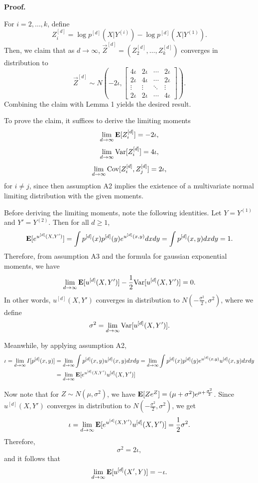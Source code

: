 \textbf{Proof.}

For $i = 2,\hdots, k$, define
\[
Z_i^{[d]} = \log p^{[d]}(X|Y^{(i)}) - \log p^{[d]}(X|Y^{(1)}).
\]
Then, we claim that as $d \to \infty$, $\vec{Z}^{[d]} = (Z_2^{[d]},\hdots, Z_k^{[d]})$ converges in distribution to
\[
\vec{Z}^{[d]} \sim N\left(-2\iota, 
\begin{bmatrix}
4\iota & 2\iota & \cdots & 2\iota\\
2\iota & 4\iota & \cdots & 2\iota\\
\vdots & \vdots & \ddots & \vdots\\
2\iota & 2\iota & \cdots & 4\iota
\end{bmatrix}
\right).
\]
Combining the claim with Lemma 1 yields the
desired result.

To prove the claim, it suffices to derive the limiting moments
\[\lim_{d \to \infty} \textbf{E}[Z_i^{[d]}]= -2\iota,\]
\[\lim_{d \to \infty} \text{Var}[Z_i^{[d]}] = 4\iota,\]
\[\lim_{d \to \infty} \text{Cov}[Z_i^{[d]}, Z_j^{[d]}]= 2\iota,\]
for $i \neq j$,
since then assumption A2 implies the existence of a multivariate normal
limiting distribution with the given moments.

Before deriving the limiting moments, note the following identities.
Let $Y = Y^{(1)}$ and $Y' = Y^{(2)}$.
Then for all $d \geq 1$,
\[
\textbf{E}[e^{u^{[d]}(X, Y')}] = \int p^{[d]}(x) p^{[d]}(y) e^{u^{[d]}(x, y)} dx dy = \int p^{[d]}(x, y) dx dy = 1.
\]
Therefore, from assumption A3 and the formula for gaussian exponential
moments, we have
\[
\lim_{d \to \infty} \textbf{E}[u^{[d]}(X, Y')]-\frac{1}{2}\text{Var}[u^{[d]}(X, Y')] = 0.
\]
In other words, $u^{[d]}(X, Y')$ converges in distribution to $N(-\frac{\sigma^2}{2}, \sigma^2)$,
where we define \[\sigma^2 = \lim_{d \to \infty} \text{Var}[u^{[d]}(X, Y')].\]

Meanwhile, by applying assumption A2,
\begin{align*}
\iota = \lim_{d \to \infty} I[p^{[d]}(x, y)] &= \lim_{d \to \infty} \int p^{[d]}(x, y) u^{[d]}(x, y) dx dy 
= \lim_{d \to \infty} \int p^{[d]}(x) p^{[d]}(y) e^{u^{[d]}(x, y)} u^{[d]}(x, y) dx dy
\\&= \lim_{d \to \infty}  \textbf{E}[e^{u^{[d]}(X, Y')}u^{[d]}(X, Y')]
\end{align*}

Now note that for $Z \sim N(\mu,\sigma^2)$, we have $\textbf{E}[Ze^Z] = (\mu + \sigma^2)e^{\mu + \frac{\sigma^2}{2}}$.
Since $u^{[d]}(X, Y')$ converges in distribution to $N(-\frac{\sigma^2}{2}, \sigma^2)$, we get
\[
\iota =  \lim_{d \to \infty}  \textbf{E}[e^{u^{[d]}(X, Y')}u^{[d]}(X, Y')] = \frac{1}{2}\sigma^2.
\]
Therefore,
\[
\sigma^2 = 2\iota,
\]
and it follows that
\[
\lim_{d \to \infty} \textbf{E}[u^{[d]}(X', Y)] = -\iota.
\]

